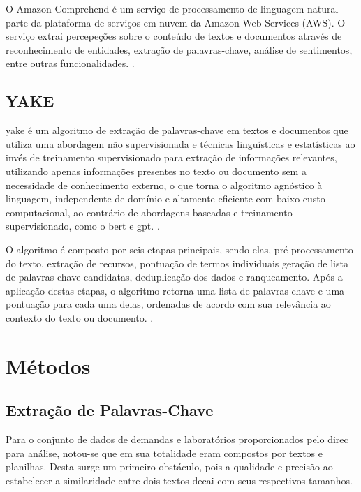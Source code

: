 O Amazon Comprehend é um serviço de processamento de linguagem natural parte da plataforma de serviços em nuvem da Amazon Web Services (AWS). O serviço extrai percepeções sobre o conteúdo de textos e documentos através de reconhecimento de entidades, extração de palavras-chave, análise de sentimentos, entre outras funcionalidades. \cite{AmazonComprehend}.

\subsection{YAKE}\label{subsec:yake}

\gls{yake} é um algoritmo de extração de palavras-chave em textos e documentos que utiliza uma abordagem não supervisionada e técnicas linguísticas e estatísticas ao invés de treinamento supervisionado para extração de informações relevantes, utilizando apenas informações presentes no texto ou documento sem a necessidade de conhecimento externo, o que torna o algoritmo agnóstico à linguagem, independente de domínio e altamente eficiente com baixo custo computacional, ao contrário de abordagens baseadas e treinamento supervisionado, como o \gls{bert} e \gls{gpt}. \cite{YakeKeywordExtractor}.

O algoritmo é composto por seis etapas principais, sendo elas, pré-processamento do texto, extração de recursos, pontuação de termos individuais geração de lista de palavras-chave candidatas, deduplicação dos dados e ranqueamento. Após a aplicação destas etapas, o algoritmo retorna uma lista de palavras-chave e uma pontuação para cada uma delas, ordenadas de acordo com sua relevância ao contexto do texto ou documento. \cite{YakeKeywordExtractor}.

\section{Métodos}\label{sec:metodos}

\subsection{Extração de Palavras-Chave}\label{subsec:keyword_extraction}

Para o conjunto de dados de demandas e laboratórios proporcionados pelo \gls{direc} para análise, notou-se que em sua totalidade eram compostos por textos e planilhas. Desta surge um primeiro obstáculo, pois a qualidade e precisão ao estabelecer a similaridade entre dois textos decai com seus respectivos tamanhos.

